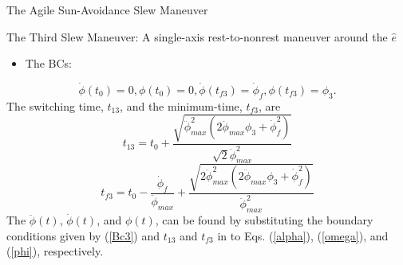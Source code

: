 \documentclass{beamer}
\begin{document}
\begin{frame}{The Agile Sun-Avoidance Slew Maneuver}
\begin{block}{The Third Slew Maneuver: A single-axis rest-to-nonrest maneuver around the $\hat{e}$}
\begin{itemize}
 \item The BCs: 
\end{itemize}
\begin{equation}\label{Bc3}
\dot{\phi}(t_0)=0,\phi(t_0)=0, \dot{\phi}(t_{f3})=\dot{\phi}_{f},\phi(t_{f3})=\phi_3.
\end{equation}
 The switching time, $t_{13}$, and the minimum-time, $t_{f3}$, are
\begin{equation}\label{t31}
t_{13}=t_0+\frac{\sqrt{\ddot{\phi}_{max}^2(2\ddot{\phi}_{max}\phi_3+\dot{\phi}_{f}^2)}}{\sqrt{2}\ddot{\phi}_{max}^2}
\end{equation}
\begin{equation}\label{tf3}
t_{f3}=t_0-\frac{\dot{\phi}_{f}}{\ddot{\phi}_{max}}+\frac{\sqrt{2\ddot{\phi}_{max}^2(2\ddot{\phi}_{max}\phi_3+\dot{\phi}_{f}^2)}}{\ddot{\phi}_{max}^2}
\end{equation}
The $\ddot{\phi}(t)$, $\dot{\phi}(t)$, and  $\phi(t)$,  can be found by substituting the boundary conditions given by (\ref{Bc3}) and $t_{13}$ and $t_{f3}$ in to Eqs. (\ref{alpha}), (\ref{omega}), and (\ref{phi}), respectively.
\end{block}
\end{frame}
%
%
\end{document}
